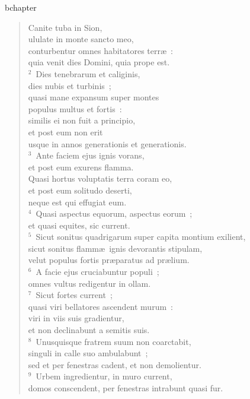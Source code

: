 bchapter\begin{verse}\vspace{-19pt}Canite tuba in Sion,\\ ululate in monte sancto meo,\\ conturbentur omnes habitatores terr\ae~:\\ quia venit dies Domini, quia prope est.\\
${}^{2}$~Dies tenebrarum et caliginis,\\ dies nubis et turbinis~;\\ quasi mane expansum super montes\\ populus multus et fortis~:\\ similis ei non fuit a principio,\\ et post eum non erit\\ usque in annos generationis et generationis.\\
${}^{3}$~Ante faciem ejus ignis vorans,\\ et post eum exurens flamma.\\ Quasi hortus voluptatis terra coram eo,\\ et post eum solitudo deserti,\\ neque est qui effugiat eum.\\
${}^{4}$~Quasi aspectus equorum, aspectus eorum~;\\ et quasi equites, sic current.\\
${}^{5}$~Sicut sonitus quadrigarum super capita montium exilient,\\ sicut sonitus flamm\ae\ ignis devorantis stipulam,\\ velut populus fortis pr\ae paratus ad pr\ae lium.\\
${}^{6}$~A facie ejus cruciabuntur populi~;\\ omnes vultus redigentur in ollam.\\
${}^{7}$~Sicut fortes current~;\\ quasi viri bellatores ascendent murum~:\\ viri in viis suis gradientur,\\ et non declinabunt a semitis suis.\\
${}^{8}$~Unusquisque fratrem suum non coarctabit,\\ singuli in calle suo ambulabunt~;\\ sed et per fenestras cadent, et non demolientur.\\
${}^{9}$~Urbem ingredientur, in muro current,\\ domos conscendent, per fenestras intrabunt quasi fur.\\

\end{verse}
